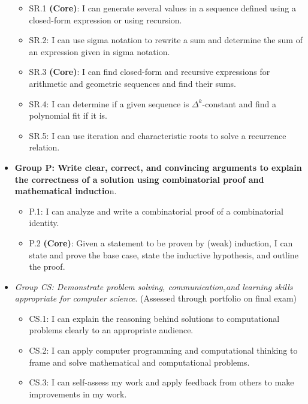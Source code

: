 \documentclass[]{article}
\providecommand{\tightlist}{%
  \setlength{\itemsep}{0pt}\setlength{\parskip}{0pt}}
\begin{document}
\begin{itemize}
  \begin{itemize}
  \tightlist
  \item
    SR.1 \textbf{(Core)}: I can generate several values in a sequence
    defined using a closed-form expression or using recursion.
  \item
    SR.2: I can use sigma notation to rewrite a sum and determine the
    sum of an expression given in sigma notation.
  \item
    SR.3 \textbf{(Core)}: I can find closed-form and recursive
    expressions for arithmetic and geometric sequences and find their
    sums.
  \item
    SR.4: I can determine if a given sequence is \(\Delta^k\)-constant
    and find a polynomial fit if it is.
  \item
    SR.5: I can use iteration and characteristic roots to solve a
    recurrence relation.
  \end{itemize}
\item
  \textbf{Group P: Write clear, correct, and convincing arguments to
  explain the correctness of a solution using combinatorial proof and
  mathematical inductio}n.

  \begin{itemize}
  \tightlist
  \item
    P.1: I can analyze and write a combinatorial proof of a
    combinatorial identity.
  \item
    P.2 \textbf{(Core)}: Given a statement to be proven by (weak)
    induction, I can state and prove the base case, state the inductive
    hypothesis, and outline the proof.
  \end{itemize}
\item
  \emph{Group CS: Demonstrate problem solving, communication,and
  learning skills appropriate for computer science}. (Assessed through
  portfolio on final exam)

  \begin{itemize}
  \tightlist
  \item
    CS.1: I can explain the reasoning behind solutions to computational
    problems clearly to an appropriate audience.
  \item
    CS.2: I can apply computer programming and computational thinking to
    frame and solve mathematical and computational problems.
  \item
    CS.3: I can self-assess my work and apply feedback from others to
    make improvements in my work.
  \end{itemize}
\end{itemize}
\end{document}
